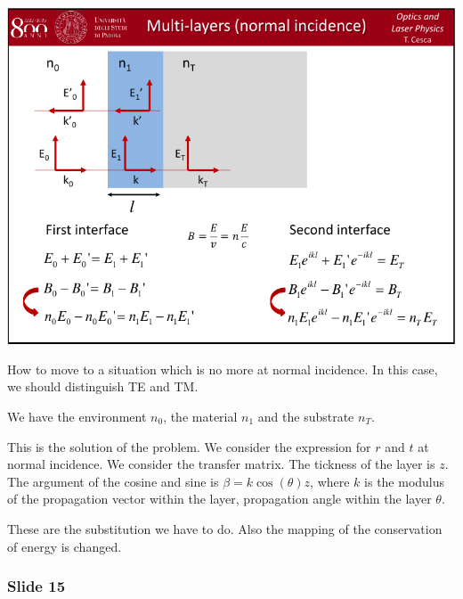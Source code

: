 \documentclass[../main/main.tex]{subfiles}
\begin{document}
\begin{minipage}[]{0.5\linewidth}
\centering
\includegraphics[page=14,width=1\textwidth]{../lessons/pdf_file/06_lecture.pdf}
\end{minipage}
\hspace{0.3cm}\vspace{0.3cm}
\begin{minipage}[c]{0.47\linewidth}

How to move to a situation which is no more at normal incidence. In this case, we should distinguish TE and TM.

We have the environment \( n_0 \), the material \( n_1 \) and the substrate \( n_T \).

This is the solution of the problem. We consider the expression for \( r \) and \( t \) at normal incidence. We consider the transfer matrix. The tickness of the layer is \( z \). The argument of the cosine and sine is \( \beta = k \cos(\theta )z  \), where \( k \) is the modulus of the propagation vector within the layer, propagation angle within the layer \( \theta  \).

These are the substitution we have to do. Also the mapping of the conservation of energy is changed.

\end{minipage}

\subsubsection*{Slide 15}
\end{document}
